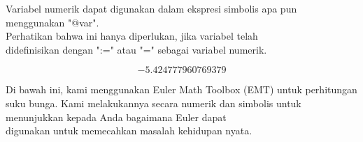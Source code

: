 \documentclass[a4paper,10pt]{article}
\begin{document}
\begin{eulernotebook}
\begin{eulercomment}
\begin{eulercomment}
\begin{eulercomment}
\begin{eulercomment}
\begin{euleroutput}
\end{euleroutput}
\begin{eulercomment}
Variabel numerik dapat digunakan dalam ekspresi simbolis apa pun
menggunakan "@var". \\
Perhatikan bahwa ini hanya diperlukan, jika variabel telah\\
didefinisikan dengan ":=" atau "=" sebagai variabel numerik.
\end{eulercomment}
\begin{eulerformula}
\[
-5.424777960769379
\]
\end{eulerformula}
\begin{eulercomment}
Di bawah ini, kami menggunakan Euler Math Toolbox (EMT) untuk
perhitungan suku bunga. Kami melakukannya secara numerik dan simbolis
untuk menunjukkan kepada Anda bagaimana Euler dapat\\
digunakan untuk memecahkan masalah kehidupan nyata.


\end{eulercomment}
\end{eulercomment}
\end{eulercomment}
\end{eulercomment}
\end{eulercomment}
\end{eulernotebook}
\end{document}
